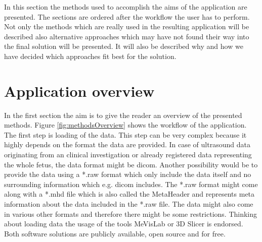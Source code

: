 
In this section the methods used to accomplish the aims of the application are presented. The sections are ordered after the workflow the user has to perform. Not only the methods which are really used in the resulting application will be described also alternative approaches which may have not found their way into the final solution will be presented. It will also be described why and how we have decided which approaches fit best for the solution.

\section{Application overview}

In the first section the aim is to give the reader an overview of the presented methods. Figure \ref{fig:methodsOverview} shows the workflow of the application. The first step is loading of the data. This step can be very complex because it highly depends on the format the data are provided. In case of ultrasound data originating from an clinical investigation or already registered data representing the whole fetus, the data format might be \gls{dicom}. Another possibility would be to provide the data using a *.raw format which only include the data itself and no surrounding information which e.g. \gls{dicom} includes. The *.raw format might come along with a *.mhd file which is also called the MetaHeader and represents meta information about the data included in the *.raw file. The data might also come in various other formats and therefore there might be some restrictions. Thinking about loading data the usage of the tools MeVisLab \cite{AGMeVisLab} or 3D Slicer \cite{Slicer3DSlicer, Fedorov20123DNetwork} is endorsed. Both software solutions are publicly available, open source and for free.\newline

